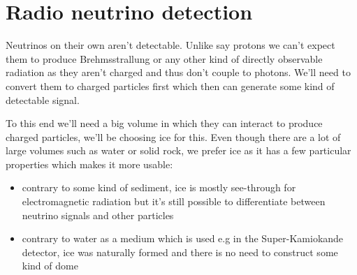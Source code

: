 \chapter{Radio neutrino detection}
\label{chap:RND}
Neutrinos on their own aren't detectable. Unlike say protons we can't expect
them to produce Brehmsstrallung or any other kind of directly observable
radiation as they aren't charged and thus don't couple to photons. We'll need
to convert them to charged particles first which then can generate some kind of
detectable signal.  

To this end we'll need a big volume in which they can interact to produce
charged particles, we'll be choosing ice for this.  Even though there are a lot
of large volumes such as water or solid rock, we prefer ice as it has a few particular properties
which makes it more usable:
\begin{itemize}
  \item contrary to some kind of sediment, ice is mostly see-through for electromagnetic radiation but it's still possible
    to differentiate between neutrino signals and other particles
  \item contrary to water as a medium which is used e.g in the Super-Kamiokande detector\cite{SuperKamio}, ice
    was naturally formed and there is no need to construct some kind of dome
\end{itemize}
